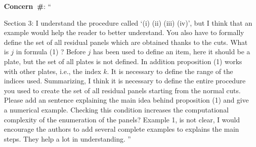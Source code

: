\documentclass[smallextended]{svjour3}       %
\makeatletter
\newcommand\gobblepars{%
    \@ifnextchar\par%
        {\expandafter\gobblepars\@gobble}%
        {}}
\newcounter{concern}
\newenvironment{concern}{%
    \refstepcounter{concern}\par\smallskip\noindent%
    \textbf{Concern~\#\theconcern}: ``\itshape\gobblepars}%
    {\unskip''\smallskip}
\makeatother
\begin{document}
\begin{concern}
Section 3: I understand the procedure called `(i) (ii) (iii) (iv)', but I think that an example would help the reader to better understand. You also have to formally define the set of all residual panels which are obtained thanks to the cuts. What is \(j\) in formula (1) ? Before \(j\) has been used to define an item, here it should be a plate, but the set of all plates is not defined. In addition proposition (1) works with other plates, i.e., the index \(k\). It is necessary to define the range of the indices used. Summarizing, I think it is necessary to define the entire procedure you used to create the set of all residual panels starting from the normal cuts. Please add an sentence explaining the main idea behind proposition (1) and give a numerical example. Checking this condition increases the computational complexity of the enumeration of the panels? Example 1, is not clear, I would encourage the authors to add several complete examples to explains the main steps. They help a lot in understanding.\label{con:sec3_concerns}
\end{concern}
\end{document}
